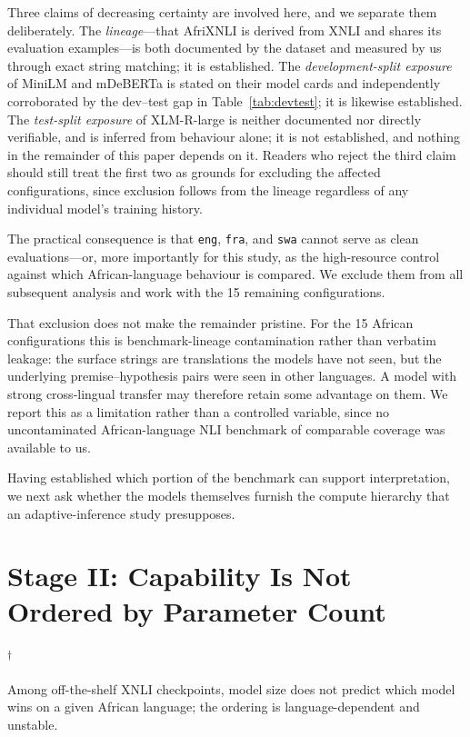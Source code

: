 \documentclass[11pt]{article}
\newcommand{\claim}[1]{#1}   %
\newcommand{\nodelta}{\textsuperscript{$\dagger$}}
\begin{document}
Three claims of decreasing certainty are involved here, and we separate them
deliberately. The \emph{lineage}---that AfriXNLI is derived from XNLI and shares
its evaluation examples---is both documented by the dataset and measured by us
through exact string matching; it is established. The \emph{development-split
exposure} of MiniLM and mDeBERTa is stated on their model cards and independently
corroborated by the dev--test gap in Table~\ref{tab:devtest}; it is likewise
established. The \emph{test-split exposure} of XLM-R-large is neither documented
nor directly verifiable, and is inferred from behaviour alone; it is not
established, and nothing in the remainder of this paper depends on it. Readers
who reject the third claim should still treat the first two as grounds for
excluding the affected configurations, since exclusion follows from the lineage
regardless of any individual model's training history.

The practical consequence is that \texttt{eng}, \texttt{fra}, and \texttt{swa}
cannot serve as clean evaluations---or, more importantly for this study, as the
high-resource control against which African-language behaviour is compared. We
exclude them from all subsequent analysis and work with the 15 remaining
configurations.

That exclusion does not make the remainder pristine.
\claim{For the 15 African configurations this is benchmark-lineage contamination
rather than verbatim leakage}: the surface strings are translations the models
have not seen, but the underlying premise--hypothesis pairs were seen in other
languages. A model with strong cross-lingual transfer may therefore retain some
advantage on them. We report this as a limitation rather than a controlled
variable, since no uncontaminated African-language NLI benchmark of comparable
coverage was available to us.

Having established which portion of the benchmark can support interpretation,
we next ask whether the models themselves furnish the compute hierarchy that an
adaptive-inference study presupposes.

\section{Stage II: Capability Is Not Ordered by Parameter Count}\nodelta
\label{sec:f2}

\claim{Among off-the-shelf XNLI checkpoints, model size does not predict which
model wins on a given African language; the ordering is language-dependent and
unstable.}
\end{document}
